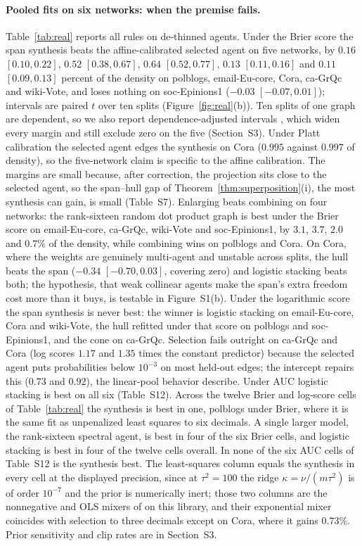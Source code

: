 \documentclass[12pt]{article}
\begin{document}
\paragraph{Pooled fits on six networks: when the premise fails.}
Table~\ref{tab:real} reports all rules on de-thinned agents. Under the Brier score the span synthesis beats the affine-calibrated selected agent on five networks, by $0.16$ $[0.10,0.22]$, $0.52$ $[0.38,0.67]$, $0.64$ $[0.52,0.77]$, $0.13$ $[0.11,0.16]$ and $0.11$ $[0.09,0.13]$ percent of the density on polblogs, email-Eu-core, Cora, ca-GrQc and wiki-Vote, and loses nothing on soc-Epinions1 ($-0.03$ $[-0.07,0.01]$); intervals are paired $t$ over ten splits (Figure~\ref{fig:real}(b)). Ten splits of one graph are dependent, so we also report dependence-adjusted intervals \citep{NadeauBengio2003}, which widen every margin and still exclude zero on the five (Section~S3). Under Platt calibration the selected agent edges the synthesis on Cora ($0.995$ against $0.997$ of density), so the five-network claim is specific to the affine calibration. The margins are small because, after correction, the projection sits close to the selected agent, so the span--hull gap of Theorem~\ref{thm:superposition}(i), the most synthesis can gain, is small (Table~S7). Enlarging beats combining on four networks: the rank-sixteen random dot product graph is best under the Brier score on email-Eu-core, ca-GrQc, wiki-Vote and soc-Epinions1, by $3.1$, $3.7$, $2.0$ and $0.7\%$ of the density, while combining wins on polblogs and Cora. On Cora, where the weights are genuinely multi-agent and unstable across splits, the hull beats the span ($-0.34$ $[-0.70,0.03]$, covering zero) and logistic stacking beats both; the hypothesis, that weak collinear agents make the span's extra freedom cost more than it buys, is testable in Figure~S1(b). Under the logarithmic score the span synthesis is never best: the winner is logistic stacking on email-Eu-core, Cora and wiki-Vote, the hull refitted under that score on polblogs and soc-Epinions1, and the cone on ca-GrQc. Selection fails outright on ca-GrQc and Cora (log scores $1.17$ and $1.35$ times the constant predictor) because the selected agent puts probabilities below $10^{-3}$ on most held-out edges; the intercept repairs this ($0.73$ and $0.92$), the linear-pool behavior \citet{RanjanGneiting2010} describe. Under AUC logistic stacking is best on all six (Table~S12). Across the twelve Brier and log-score cells of Table~\ref{tab:real} the synthesis is best in one, polblogs under Brier, where it is the same fit as unpenalized least squares to six decimals. A single larger model, the rank-sixteen spectral agent, is best in four of the six Brier cells, and logistic stacking is best in four of the twelve cells overall. In none of the six AUC cells of Table~S12 is the synthesis best. The least-squares column equals the synthesis in every cell at the displayed precision, since at $\tau^2=100$ the ridge $\kappa=\nu/(m\tau^2)$ is of order $10^{-7}$ and the prior is numerically inert; those two columns are the nonnegative and OLS mixers of \citet{LiLe2024} on this library, and their exponential mixer coincides with selection to three decimals except on Cora, where it gains $0.73\%$. Prior sensitivity and clip rates are in Section~S3.
\end{document}
